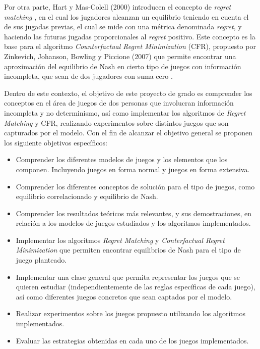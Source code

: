 Por otra parte, Hart y Mas-Colell (2000) introducen el concepto de \textit{regret matching} \cite{bib:correlated-equilibrium}, en el cual los jugadores alcanzan un equilibrio teniendo en cuenta el  de sus jugadas previas, el cual se mide con una métrica denominada \textit{regret}, y haciendo las futuras jugadas proporcionales al \textit{regret} positivo. Este concepto es la base para el algoritmo \textit{Counterfactual Regret Minimization} (CFR), propuesto por Zinkevich, Johanson, Bowling y Piccione (2007) que permite encontrar una aproximación del equilibrio de Nash en cierto tipo de juegos con información incompleta, que sean de dos jugadores con suma cero \cite{bib:cfr}.

Dentro de este contexto, el objetivo de este proyecto de grado es comprender los conceptos en el área de juegos de dos personas que involucran información incompleta y no determinismo, así como implementar los algoritmos de \textit{Regret Matching} y CFR, realizando experimentos sobre distintos juegos que son capturados por el modelo. Con el fin de alcanzar el objetivo general se proponen los siguiente objetivos específicos:
\begin{itemize}
    \item Comprender los diferentes modelos de juegos y los elementos que los componen. Incluyendo juegos en forma normal y juegos en forma extensiva.
    \item Comprender los diferentes conceptos de solución para el tipo de juegos, como equilibrio correlacionado y equilibrio de Nash.
    \item Comprender los resultados teóricos más relevantes, y sus demostraciones, en relación a los modelos de juegos estudiados y los algoritmos implementados.
    \item Implementar los algoritmos \textit{Regret Matching} y \textit{Conterfactual Regret Minimization} que permiten encontrar equilibrios de Nash para el tipo de juego planteado.
    \item Implementar una clase general que permita representar los juegos que se quieren estudiar (independientemente de las reglas específicas de cada juego), así como diferentes juegos concretos que sean captados por el modelo.
    \item Realizar experimentos sobre los juegos propuesto utilizando los algoritmos implementados.
    \item Evaluar las estrategias obtenidas en cada uno de los juegos implementados.
\end{itemize}

